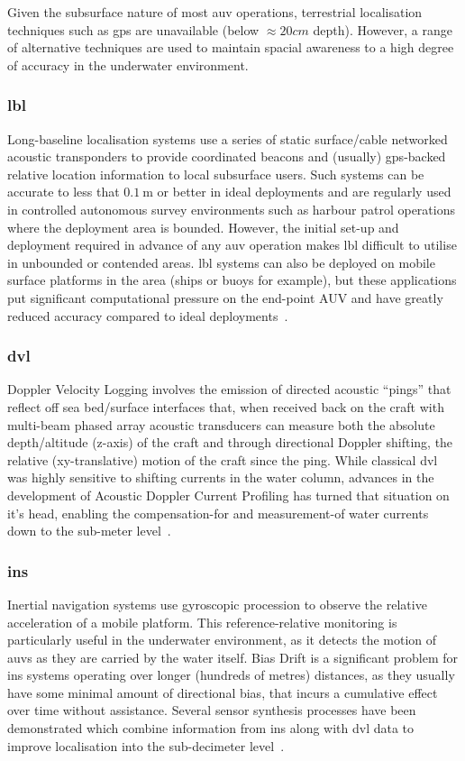 Given the subsurface nature of most \gls{auv} operations, terrestrial localisation techniques such as \gls{gps} are unavailable (below $\approx 20cm$ depth). 
However, a range of alternative techniques are used to maintain spacial awareness to a high degree of accuracy in the underwater environment.
\subsubsection{\gls{lbl}}
Long-baseline localisation systems use a series of static surface/cable networked acoustic transponders to provide coordinated beacons and (usually) \gls{gps}-backed relative location information to local subsurface users. 
Such systems can be accurate to less that $0.\SI{1}{\meter}$ or better in ideal deployments and are regularly used in controlled autonomous survey environments such as harbour patrol operations where the deployment area is bounded. 
However, the initial set-up and deployment required in advance of any \gls{auv} operation makes \gls{lbl} difficult to utilise in unbounded or contended areas.
\gls{lbl} systems can also be deployed on mobile surface platforms in the area (ships or buoys for example), but these applications put significant computational pressure on the end-point AUV and have greatly reduced accuracy compared to ideal deployments~\cite{Matos1999}.
\subsubsection{\gls{dvl}}
Doppler Velocity Logging involves the emission of directed acoustic ``pings'' that reflect off sea bed/surface interfaces that, when received back on the craft with multi-beam phased array acoustic transducers can measure both the absolute depth/altitude (z-axis) of the craft and through directional Doppler shifting, the relative (xy-translative) motion of the craft since the ping.
While classical \gls{dvl} was highly sensitive to shifting currents in the water column, advances in the development of Acoustic Doppler Current Profiling has turned that situation on it's head, enabling the compensation-for and measurement-of water currents down to the sub-meter level~\cite{Snyder2010}.
\subsubsection{\gls{ins}}
Inertial navigation systems use gyroscopic procession to observe the relative acceleration of a mobile platform.
This reference-relative monitoring is particularly useful in the underwater environment, as it detects the motion of \glspl{auv} as they are carried by the water itself.
Bias Drift is a significant problem for \gls{ins} systems operating over longer (hundreds of metres) distances, as they usually have some minimal amount of directional bias, that incurs a cumulative effect over time without assistance.
Several sensor synthesis processes have been demonstrated which combine information from \gls{ins} along with \gls{dvl} data to improve localisation into the sub-decimeter level~\cite{Jalving2003,Liu2014,Allotta2015}.
